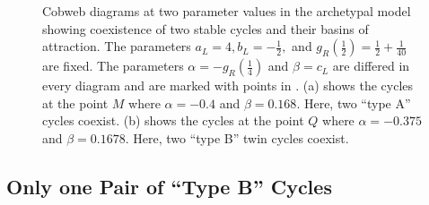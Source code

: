 \begin{figure}
	\centering
	\caption[Cobweb diagrams at two parameter values in the archetypal model showing coexistence of two stable cycles and their basins of attraction]{
		Cobweb diagrams at two parameter values in the archetypal model showing coexistence of two stable cycles and their basins of attraction.
		The parameters $a_L = 4, b_L = -\frac{1}{2},$ and $g_R\left(\frac{1}{2}\right) = \frac{1}{2} + \frac{1}{40}$ are fixed.
		The parameters $\alpha = -g_R\left(\frac{1}{4}\right)$ and $\beta = c_L$ are differed in every diagram and are marked with points in .
		(a) shows the cycles at the point $M$ where $\alpha = -0.4$ and $\beta = 0.168$.
		Here, two ``type A'' cycles coexist.
		(b) shows the cycles at the point $Q$ where $\alpha = -0.375$ and $\beta = 0.1678$.
		Here, two ``type B'' twin cycles coexist.
	}
\end{figure}

\subsection{Only one Pair of ``Type B'' Cycles}


